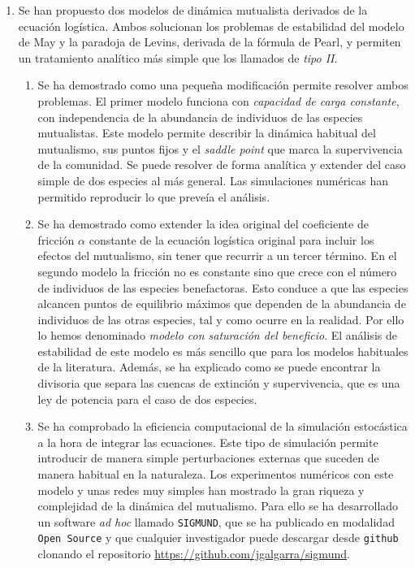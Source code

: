 \begin{enumerate}
\item Se han propuesto dos modelos de dinámica mutualista derivados de la ecuación logística. Ambos solucionan los problemas de estabilidad del modelo de May y la paradoja de Levins, derivada de la fórmula de Pearl, y permiten un tratamiento analítico más simple que los llamados de \textit{tipo II}.
	\begin{enumerate}
	\item Se ha demostrado como una pequeña modificación permite resolver ambos problemas. El primer modelo funciona con \textit{capacidad de carga constante}, con independencia de la abundancia de individuos de las especies mutualistas. Este modelo permite describir la dinámica habitual del mutualismo, sus puntos fijos y el \textit{saddle point} que marca la supervivencia de la comunidad. Se puede resolver de forma analítica y extender del caso simple de dos especies al más general. Las simulaciones numéricas han permitido reproducir lo que preveía el análisis.
	\item Se ha demostrado como extender la idea original del coeficiente de fricción $\alpha$ constante de la ecuación logística original para incluir los efectos del mutualismo, sin tener que recurrir a un tercer término. En el segundo modelo la fricción no es constante sino que crece con el número de individuos de las especies benefactoras. Esto conduce a que las especies alcancen puntos de equilibrio máximos que dependen de la abundancia de individuos de las otras especies, tal y como ocurre en la realidad. Por ello lo hemos denominado \textit{modelo con saturación del beneficio}. 
	El análisis de estabilidad de este modelo es más sencillo que para los modelos habituales de la literatura. Además, se ha explicado como se puede encontrar la divisoria que separa las cuencas de extinción y supervivencia, que es una ley de potencia para el caso de dos especies.
	\item Se ha comprobado la eficiencia computacional de la simulación estocástica a la hora de integrar las ecuaciones. Este tipo de simulación permite introducir de manera simple perturbaciones externas que suceden de manera habitual en la naturaleza. Los experimentos numéricos con este modelo y unas redes muy simples han mostrado la gran riqueza y complejidad de la dinámica del mutualismo. Para ello se ha desarrollado un software \textit{ad hoc} llamado \texttt{SIGMUND}, que se ha publicado en modalidad \texttt{Open Source} y que cualquier investigador puede descargar desde \texttt{github} clonando el repositorio \url{https://github.com/jgalgarra/sigmund}.
	\end{enumerate}
	


\end{enumerate}
